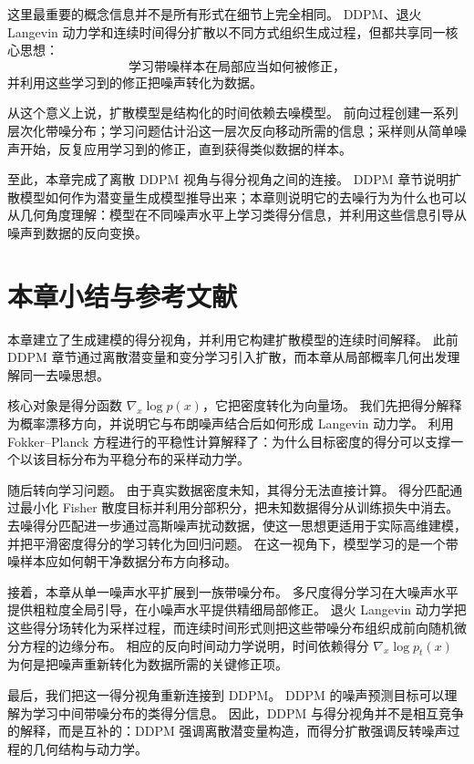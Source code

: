 这里最重要的概念信息并不是所有形式在细节上完全相同。
DDPM、退火 Langevin 动力学和连续时间得分扩散以不同方式组织生成过程，但都共享同一核心思想：
\[
\text{学习带噪样本在局部应当如何被修正，}
\]
并利用这些学习到的修正把噪声转化为数据。

从这个意义上说，扩散模型是结构化的时间依赖去噪模型。
前向过程创建一系列层次化带噪分布；学习问题估计沿这一层次反向移动所需的信息；采样则从简单噪声开始，反复应用学习到的修正，直到获得类似数据的样本。

至此，本章完成了离散 DDPM 视角与得分视角之间的连接。
DDPM 章节说明扩散模型如何作为潜变量生成模型推导出来；本章则说明它的去噪行为为什么也可以从几何角度理解：模型在不同噪声水平上学习类得分信息，并利用这些信息引导从噪声到数据的反向变换。

\section*{本章小结与参考文献}

本章建立了生成建模的得分视角，并利用它构建扩散模型的连续时间解释。
此前 DDPM 章节通过离散潜变量和变分学习引入扩散，而本章从局部概率几何出发理解同一去噪思想。

核心对象是得分函数 $\nabla_x \log p(x)$，它把密度转化为向量场。
我们先把得分解释为概率漂移方向，并说明它与布朗噪声结合后如何形成 Langevin 动力学。
利用 Fokker--Planck 方程进行的平稳性计算解释了：为什么目标密度的得分可以支撑一个以该目标分布为平稳分布的采样动力学。

随后转向学习问题。
由于真实数据密度未知，其得分无法直接计算。
得分匹配通过最小化 Fisher 散度目标并利用分部积分，把未知数据得分从训练损失中消去。
去噪得分匹配进一步通过高斯噪声扰动数据，使这一思想更适用于实际高维建模，并把平滑密度得分的学习转化为回归问题。
在这一视角下，模型学习的是一个带噪样本应如何朝干净数据分布方向移动。

接着，本章从单一噪声水平扩展到一族带噪分布。
多尺度得分学习在大噪声水平提供粗粒度全局引导，在小噪声水平提供精细局部修正。
退火 Langevin 动力学把这些得分场转化为采样过程，而连续时间形式则把这些带噪分布组织成前向随机微分方程的边缘分布。
相应的反向时间动力学说明，时间依赖得分
$\nabla_x \log p_t(x)$
为何是把噪声重新转化为数据所需的关键修正项。

最后，我们把这一得分视角重新连接到 DDPM。
DDPM 的噪声预测目标可以理解为学习中间带噪分布的类得分信息。
因此，DDPM 与得分视角并不是相互竞争的解释，而是互补的：DDPM 强调离散潜变量构造，而得分扩散强调反转噪声过程的几何结构与动力学。

\bigskip

